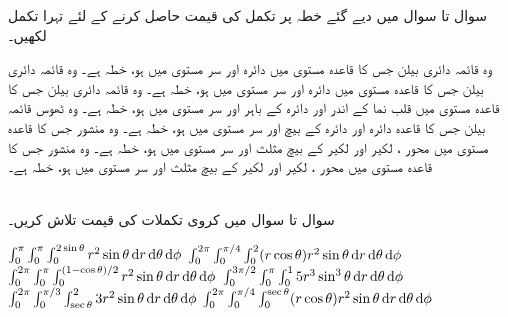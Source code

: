 سوال  تا سوال   میں دیے گئے خطہ  پر تکمل  کی قیمت حاصل کرنے کے لئے تہرا تکمل لکھیں۔

وہ     قائمہ دائری بیلن جس کا  قاعدہ  مستوی  میں  دائرہ   اور  سر   مستوی میں  ہو، خطہ  ہے۔
وہ   قائمہ دائری بیلن جس کا  قاعدہ  مستوی  میں  دائرہ   اور  سر   مستوی  میں   ہو، خطہ  ہے۔
وہ  قائمہ دائری بیلن جس کا  قاعدہ  مستوی  میں  قلب نما   کے اندر  اور دائرہ  کے باہر  اور سر  مستوی  میں   ہو، خطہ  ہے۔
وہ ٹھوس قائمہ بیلن جس کا  قاعدہ دائرہ  اور دائرہ  کے بیچ اور سر مستوی  میں ہو،  خطہ  ہے۔
وہ منشور جس کا قاعدہ مستوی  میں  محور ،  لکیر  اور لکیر  کے بیچ  مثلث   اور  سر مستوی  میں ہو، خطہ  ہے۔
وہ منشور جس کا قاعدہ مستوی  میں  محور ،  لکیر  اور لکیر  کے بیچ  مثلث  اور  سر مستوی  میں ہو، خطہ  ہے۔

\\
سوال  تا سوال  میں کروی تکملات کی قیمت تلاش کریں۔

$\int_{0}^{\pi}\int_{0}^{\pi}\int_{0}^{2\sin\theta} r^2\sin\theta \dif r\dif\theta\dif\phi$
$\int_{0}^{2\pi}\int_{0}^{\pi/4}\int_{0}^{2} (r\cos\theta) r^2\sin\theta\dif r\dif\theta\dif\phi$
$\int_{0}^{2\pi}\int_{0}^{\pi}\int_{0}^{(1-\cos\theta)/2} r^2\sin\theta\dif r\dif\theta\dif\phi$
$\int_{0}^{3\pi/2}\int_{0}^{\pi}\int_{0}^{1} 5 r^3\sin^3\theta\dif r\dif\theta\dif\phi$
$\int_{0}^{2\pi}\int_{0}^{\pi/3}\int_{\sec\theta}^{2} 3 r^2\sin\theta\dif r\dif\theta\dif\phi$
$\int_{0}^{2\pi}\int_{0}^{\pi/4}\int_{0}^{\sec\theta} (r\cos\theta) r^2\sin\theta\dif r\dif\theta\dif\phi$

